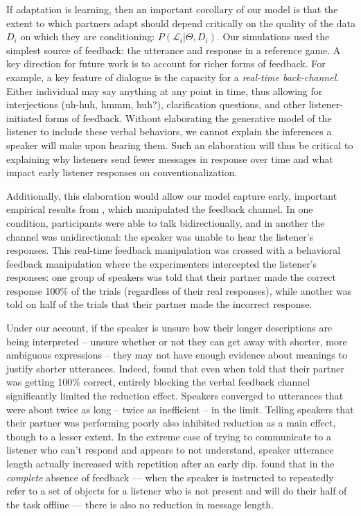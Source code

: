 If adaptation is learning, then an important corollary of our model is that the extent to which partners adapt should depend critically on the quality of the data $D_i$ on which they are conditioning: $P(\mathcal{L}_i | \Theta, D_i)$.
Our simulations used the simplest source of feedback: the utterance and response in a reference game.
A key direction for future work is to account for richer forms of feedback.
For example, a key feature of dialogue is the capacity for a \emph{real-time back-channel}.
Either individual may say anything at any point in time, thus allowing for interjections (uh-huh, hmmm, huh?), clarification questions, and other listener-initiated forms of feedback. 
Without elaborating the generative model of the listener to include these verbal behaviors, we cannot explain the inferences a speaker will make upon hearing them.
Such an elaboration will thus be critical to explaining why listeners send fewer messages in response over time and what impact early listener responses on conventionalization. 

Additionally, this elaboration would allow our model capture early, important empirical results from , which manipulated the feedback channel.
In one condition, participants were able to talk bidirectionally, and in another the channel was unidirectional: the speaker was unable to hear the listener's responses. 
This real-time feedback manipulation was crossed with a behavioral feedback manipulation where the experimenters intercepted the listener's responses: one group of speakers was told that their partner made the correct response 100\% of the trials (regardless of their real responses), while another was told on half of the trials that their partner made the incorrect response. 

Under our account, if the speaker is unsure how their longer descriptions are being interpreted -- unsure whether or not they can get away with shorter, more ambiguous expressions -- they may not have enough evidence about meanings to justify shorter utterances. 
Indeed,  found that even when told that their partner was getting 100\% correct, entirely blocking the verbal feedback channel significantly limited the reduction effect. 
Speakers converged to utterances that were about twice as long -- twice as inefficient -- in the limit. 
Telling speakers that their partner was performing poorly also inhibited reduction as a main effect, though to a lesser extent. 
In the extreme case of trying to communicate to a listener who can't respond and appears to not understand, speaker utterance length actually increased with repetition after an early dip. 
 found that in the \emph{complete} absence of feedback --- when the speaker is instructed to repeatedly refer to a set of objects for a listener who is not present and will do their half of the task offline --- there is also no reduction in message length. 

